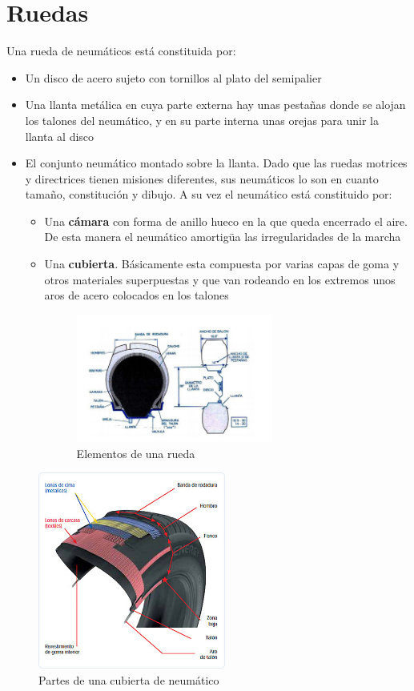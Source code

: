 \documentclass[a4paper,12pt,oneside]{book}
\begin{document}
\section{Ruedas}
\label{sec:org6f0b2b4}

Una rueda de neumáticos está constituida por:
\begin{itemize}
\item Un disco de acero sujeto con tornillos al plato del semipalier
\item Una llanta metálica en cuya parte externa hay unas pestañas donde se alojan
los talones del neumático, y en su parte interna unas orejas para unir la
llanta al disco
\item El conjunto neumático montado sobre la llanta. Dado que las ruedas motrices y
directrices tienen misiones diferentes, sus neumáticos lo son en cuanto
tamaño, constitución y dibujo. A su vez el neumático está constituido por:
\begin{itemize}
\item Una \textbf{cámara} con forma de anillo hueco en la que queda encerrado el
aire. De esta manera el neumático amortigüa las irregularidades de la marcha
\item Una \textbf{cubierta}. Básicamente esta compuesta por varias capas de
goma y otros materiales superpuestas y que van rodeando en los extremos unos
aros de acero colocados en los talones 

\begin{figure}[htbp]
\centering
\includegraphics[width=0.65\textwidth]{./img_0009/esquema_rueda.PNG}
\caption{Elementos de una rueda}
\end{figure}
\end{itemize}
\end{itemize}


\begin{figure}[htbp]
\centering
\includegraphics[width=0.55\textwidth]{./img_0009/neumatico1.jpg}
\caption{Partes de una cubierta de neumático}
\end{figure}
\end{document}
